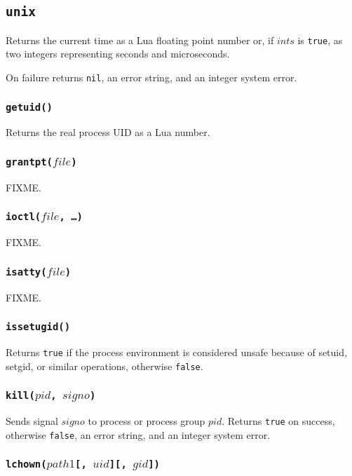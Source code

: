 \documentclass[11pt, oneside]{memoir}
\newcommand*{\true}[0]{\texttt{true}\xspace}
\newcommand*{\false}[0]{\texttt{false}\xspace}
\newcommand*{\nil}[0]{\texttt{nil}\xspace}
\newcommand*{\fn}[1]{\texttt{#1}\xspace}
\newcounter{toccols}
\newenvironment{Module}[1]{
	\subsection{\texttt{#1}}
	\addtocontents{toc}{
		\protect\begin{multicols}{\value{toccols}}
	}
}{
	\addtocontents{toc}{\protect\end{multicols}}
}
\begin{document}
\begin{Module}{unix}
Returns the current time as a Lua floating point number or, if $ints$ is \true, as two integers representing seconds and microseconds.

On failure returns \nil, an error string, and an integer system error.

\subsubsection[\fn{getuid}]{\fn{getuid()}}

Returns the real process UID as a Lua number.

\subsubsection[\fn{grantpt}]{\fn{grantpt($file$)}}

FIXME.

\subsubsection[\fn{ioctl}]{\fn{ioctl($file$, \ldots)}}

FIXME.

\subsubsection[\fn{isatty}]{\fn{isatty($file$)}}

FIXME.

\subsubsection[\fn{issetugid}]{\fn{issetugid()}}

Returns \true if the process environment is considered unsafe because of setuid, setgid, or similar operations, otherwise \false.

\subsubsection[\fn{kill}]{\fn{kill($pid$, $signo$)}}

Sends signal $signo$ to process or process group $pid$. Returns \true on success, otherwise \false, an error string, and an integer system error.

\subsubsection[\fn{lchown}]{\fn{lchown($path1$[, $uid$][, $gid$])}}


\end{Module}
\end{document}
